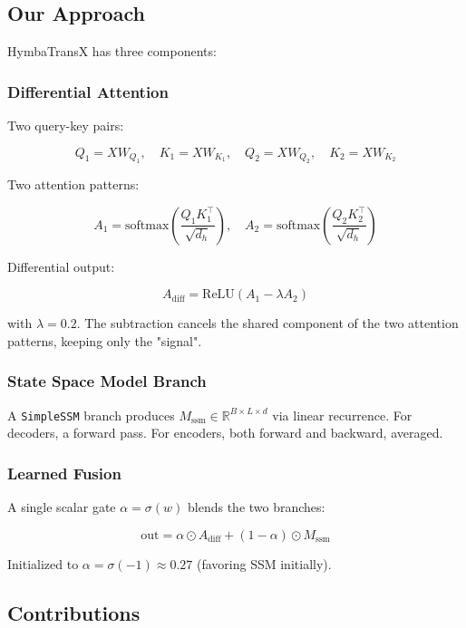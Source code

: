 \subsection{Our Approach}

HymbaTransX has three components:

\subsubsection{Differential Attention}

Two query-key pairs:

\[
Q_1 = X W_{Q_1}, \quad K_1 = X W_{K_1}, \quad
Q_2 = X W_{Q_2}, \quad K_2 = X W_{K_2}
\tag{1.1}
\]

Two attention patterns:

\[
A_1 = \text{softmax}\!\left(\frac{Q_1 K_1^\top}{\sqrt{d_h}}\right), \quad
A_2 = \text{softmax}\!\left(\frac{Q_2 K_2^\top}{\sqrt{d_h}}\right)
\tag{1.2}
\]

Differential output:

\[
A_\text{diff} = \text{ReLU}(A_1 - \lambda A_2)
\tag{1.3}
\]

with $\lambda = 0.2$. The subtraction cancels the shared component of the 
two attention patterns, keeping only the "signal".

\subsubsection{State Space Model Branch}

A \texttt{SimpleSSM} branch produces $M_\text{ssm} \in \mathbb{R}^{B \times L \times d}$ 
via linear recurrence. For decoders, a forward pass. For encoders, both 
forward and backward, averaged.

\subsubsection{Learned Fusion}

A single scalar gate $\alpha = \sigma(w)$ blends the two branches:

\[
\text{out} = \alpha \odot A_\text{diff} + (1 - \alpha) \odot M_\text{ssm}
\tag{1.4}
\]

Initialized to $\alpha = \sigma(-1) \approx 0.27$ (favoring SSM initially).

\subsection{Contributions}

